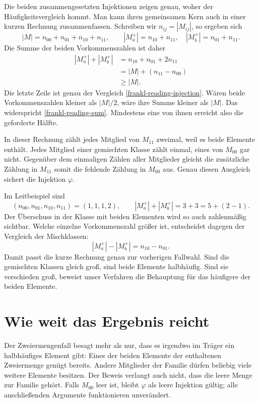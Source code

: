 Die beiden zusammengesetzten Injektionen zeigen genau, woher
der Häufigkeitsvergleich kommt. Man kann ihren gemeinsamen
Kern auch in einer kurzen Rechnung zusammenfassen.
Schreiben wir \(n_{ij}=|M_{ij}|\), so ergeben sich
\[
  |M|=n_{00}+n_{01}+n_{10}+n_{11},\qquad
  |M_a^+|=n_{10}+n_{11},\quad
  |M_b^+|=n_{01}+n_{11}.
\]
Die Summe der beiden Vorkommenszahlen ist daher
\begin{equation}
  \begin{aligned}
    |M_a^+|+|M_b^+|
      &=n_{10}+n_{01}+2n_{11}\\
      &=|M|+(n_{11}-n_{00})\\
      &\geq|M|.
  \end{aligned}
  \tag{S}\label{frankl-reading-sum}
\end{equation}
Die letzte Zeile ist genau der Vergleich
\eqref{frankl-reading-injection}. Wären beide Vorkommenszahlen
kleiner als \(|M|/2\), wäre ihre Summe kleiner als \(|M|\).
Das widerspricht \eqref{frankl-reading-sum}. Mindestens eine
von ihnen erreicht also die geforderte Hälfte.

In dieser Rechnung zählt jedes Mitglied von \(M_{11}\)
zweimal, weil es beide Elemente enthält. Jedes Mitglied
einer gemischten Klasse zählt einmal, eines von \(M_{00}\)
gar nicht. Gegenüber dem einmaligen Zählen aller Mitglieder
gleicht die zusätzliche Zählung in \(M_{11}\) somit die
fehlende Zählung in \(M_{00}\) aus. Genau diesen Ausgleich
sichert die Injektion \(\varphi\).

Im Leitbeispiel sind
\[
  (n_{00},n_{01},n_{10},n_{11})=(1,1,1,2),
  \qquad |M_a^+|+|M_b^+|=3+3=5+(2-1).
\]
Der Überschuss in der Klasse mit beiden Elementen wird so
auch zahlenmäßig sichtbar. Welche einzelne Vorkommenszahl
größer ist, entscheidet dagegen der Vergleich der Mischklassen:
\[
  |M_a^+|-|M_b^+|=n_{10}-n_{01}.
\]
Damit passt die kurze Rechnung genau zur vorherigen Fallwahl.
Sind die gemischten Klassen gleich groß, sind beide Elemente
halbhäufig. Sind sie verschieden groß, beweist unser Verfahren
die Behauptung für das häufigere der beiden Elemente.

\par{}
\section*{Wie weit das Ergebnis reicht}
\hypertarget{frankl.reading.scope}{}

Der Zweiermengenfall besagt mehr als nur, dass es irgendwo
im Träger ein halbhäufiges Element gibt: Eines der beiden
Elemente der enthaltenen Zweiermenge genügt bereits.
Andere Mitglieder der Familie dürfen beliebig viele weitere
Elemente besitzen. Der Beweis verlangt auch nicht, dass die
leere Menge zur Familie gehört. Falls \(M_{00}\) leer ist,
bleibt \(\varphi\) als leere Injektion gültig; alle
anschließenden Argumente funktionieren unverändert.

